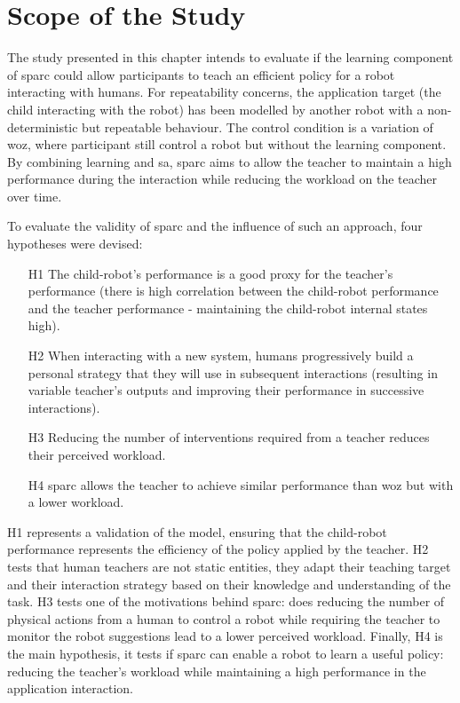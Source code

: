 \section{Scope of the Study}

The study presented in this chapter intends to evaluate if the learning component of \gls{sparc} could allow participants to teach an efficient policy for a robot interacting with humans. For repeatability concerns, the application target (the child interacting with the robot) has been modelled by another robot with a non-deterministic but repeatable behaviour. The control condition is a variation of \gls{woz}, where participant still control a robot but without the learning component. By combining learning and \gls{sa}, \gls{sparc} aims to allow the teacher to maintain a high performance during the interaction while reducing the workload on the teacher over time.

To evaluate the validity of \gls{sparc} and the influence of such an approach, four hypotheses were devised:
\begin{enumerate}
	\item [H1] The child-robot's performance is a good proxy for the teacher's performance (there is high correlation between the child-robot performance and the teacher performance - maintaining the child-robot internal states high).
	\item [H2] When interacting with a new system, humans progressively build a personal strategy that they will use in subsequent interactions (resulting in variable teacher's outputs and improving their performance in successive interactions).
	\item [H3] Reducing the number of interventions required from a teacher reduces their perceived workload.
	\item [H4] \gls{sparc} allows the teacher to achieve similar performance than \gls{woz} but with a lower workload.
\end{enumerate}

H1 represents a validation of the model, ensuring that the child-robot performance represents the efficiency of the policy applied by the teacher. H2 tests that human teachers are not static entities, they adapt their teaching target and their interaction strategy based on their knowledge and understanding of the task. H3 tests one of the motivations behind \gls{sparc}: does reducing the number of physical actions from a human to control a robot while requiring the teacher to monitor the robot suggestions lead to a lower perceived workload. Finally, H4 is the main hypothesis, it tests if \gls{sparc} can enable a robot to learn a useful policy: reducing the teacher's workload while maintaining a high performance in the application interaction.

